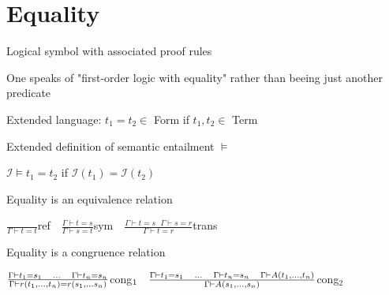 \section{Equality}
\enumstart
	\item Logical symbol with associated proof rules
	\item One speaks of "first-order logic with equality" rather than beeing just another predicate
	\item Extended language: $t_1 = t_2 \in$ Form if $t_1, t_2 \in$ Term
	\item Extended definition of semantic entailment $\vDash$
	\enumstart
		\item $\mathcal{I} \vDash t_1 = t_2$ if $\mathcal{I}(t_1) = \mathcal{I}(t_2)$
	\enumend
	\item Equality is an equivalence relation
	\enumstart
		\item $\frac{}{\Gamma \vdash t = t}$ref $\ \ \ \frac{\Gamma \vdash t = s}{\Gamma \vdash s = t}$sym $\ \ \ \frac{\Gamma \vdash t = s \ \ \ \Gamma \vdash s = r}{\Gamma \vdash t = r}$trans
	\enumend
	\item Equality is a congruence relation
	\enumstart
		\item $\frac{\Gamma \vdash t_1 = s_1 \ \ \ \mathellipsis \ \ \ \Gamma \vdash t_n = s_n}{\Gamma \vdash r(t_1, \mathellipsis, t_n) = r(s_1, \mathellipsis s_n)}$cong$_1 \ \ \ \frac{\Gamma \vdash t_1 = s_1 \ \ \ \mathellipsis \ \ \ \Gamma \vdash t_n = s_n \ \ \ \Gamma \vdash A(t_1, \mathellipsis, t_n)}{\Gamma \vdash A(s_1, \mathellipsis, s_n)}$cong$_2$
	\enumend
\enumend